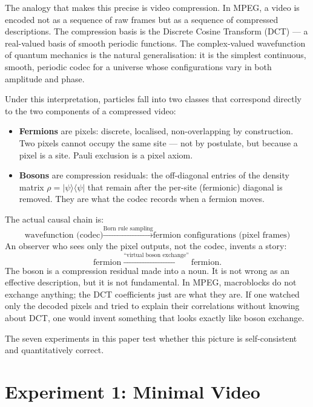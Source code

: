 \documentclass[11pt]{article}
\begin{document}
The analogy that makes this precise is video compression.
In MPEG, a video is encoded not as a sequence of raw frames but as a sequence
of compressed descriptions.
The compression basis is the Discrete Cosine Transform (DCT) --- a real-valued
basis of smooth periodic functions.
The complex-valued wavefunction of quantum mechanics is the natural
generalisation: it is the simplest continuous, smooth, periodic codec for
a universe whose configurations vary in both amplitude and phase.

Under this interpretation, particles fall into two classes that correspond
directly to the two components of a compressed video:

\begin{itemize}
  \item \textbf{Fermions} are pixels: discrete, localised, non-overlapping by
        construction. Two pixels cannot occupy the same site --- not by postulate,
        but because a pixel is a site. Pauli exclusion is a pixel axiom.
  \item \textbf{Bosons} are compression residuals: the off-diagonal entries of
        the density matrix $\rho = |\psi\rangle\langle\psi|$ that remain after
        the per-site (fermionic) diagonal is removed. They are what the codec
        records when a fermion moves.
\end{itemize}

The actual causal chain is:
\[
  \text{wavefunction (codec)}
  \xrightarrow{\text{Born rule sampling}}
  \text{fermion configurations (pixel frames)}
\]
An observer who sees only the pixel outputs, not the codec, invents a story:
\[
  \text{fermion}
  \xrightarrow{\text{``virtual boson exchange''}}
  \text{fermion}.
\]
The boson is a compression residual made into a noun.
It is not wrong as an effective description, but it is not fundamental.
In MPEG, macroblocks do not exchange anything; the DCT coefficients just are
what they are.
If one watched only the decoded pixels and tried to explain their correlations
without knowing about DCT, one would invent something that looks exactly like
boson exchange.

The seven experiments in this paper test whether this picture is self-consistent
and quantitatively correct.

\section{Experiment 1: Minimal Video}
\label{sec:exp1}
\end{document}

